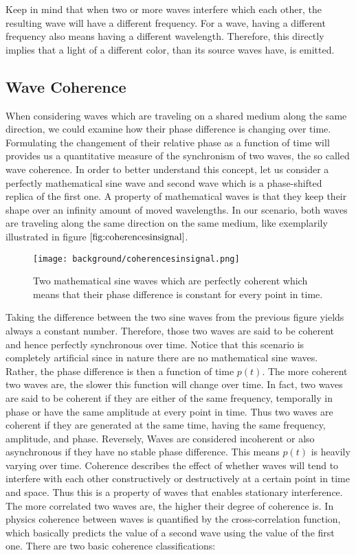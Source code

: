 Keep in mind that when two or more waves interfere which each other, the resulting wave will have a different frequency. For a wave, having a different frequency also means having a different wavelength. Therefore, this directly implies that a light of a different color, than its source waves have, is emitted. 

\subsection{Wave Coherence}
\label{sec:wavecoherence}
When considering waves which are traveling on a shared medium along the same direction, we could examine how their phase difference is changing over time. Formulating the changement of their relative phase as a function of time will provides us a quantitative measure of the synchronism of two waves, the so called wave coherence. In order to better understand this concept, let us consider a perfectly mathematical sine wave and second wave which is a phase-shifted replica of the first one. A property of mathematical waves is that they keep their shape over an infinity amount of moved wavelengths. In our scenario, both waves are traveling along the same direction on the same medium, like exemplarily illustrated in figure $\ref{fig:coherencesinsignal}$.
\begin{figure}[H]
  \centering
  \texttt{[image: background/coherencesinsignal.png]}
  \caption[Wave Coherence]{Two mathematical sine waves which are perfectly coherent which means that their phase difference is constant for every point in time.}
  \label{fig:coherencesinsignal}
\end{figure}

Taking the difference between the two sine waves from the previous figure yields always a constant number. Therefore, those two waves are said to be coherent and hence perfectly synchronous over time. Notice that this scenario is completely artificial since in nature there are no mathematical sine waves. Rather, the phase difference is then a function of time $p(t)$. The more coherent two waves are, the slower this function will change over time. 
In fact, two waves are said to be coherent if they are either of the same frequency, temporally in phase or have the same amplitude at every point in time.
Thus two waves are coherent if they are generated at the same time, having the same frequency, amplitude, and phase. Reversely, Waves are considered incoherent or also asynchronous if they have no stable phase difference. This means $p(t)$ is heavily varying over time. Coherence describes the effect of whether waves will tend to interfere with each other constructively or destructively at a certain point in time and space. Thus this is a property of waves that enables stationary interference. The more correlated two waves are, the higher their degree of coherence is. In physics coherence between waves is quantified by the cross-correlation function, which basically predicts the value of a second wave using the value of the first one. There are two basic coherence classifications:

